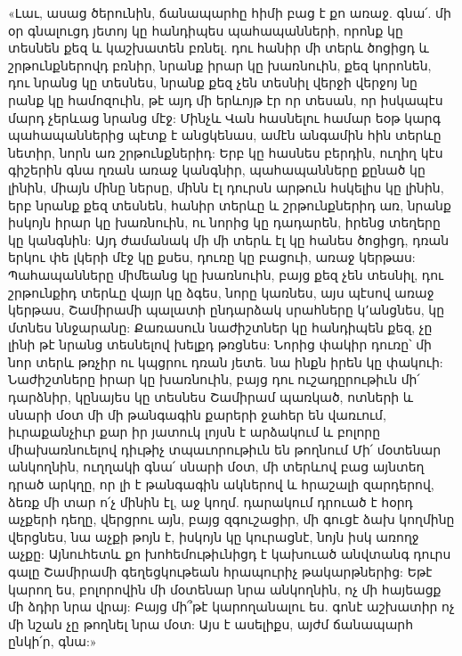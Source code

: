 \documentclass{article}
\begin{document}
{«Լաւ, ասաց ծերունին, ճանապարհը հիմի բաց է քո առաջ. գնա՛. մի օր գնալուցդ յետոյ կը հանդիպես պահապանների, որոնք կը տեսնեն քեզ և կաշխատեն բռնել. դու հանիր մի տերև ծոցիցդ և շրթունքներովդ բռնիր, նրանք իրար կը խառնուին, քեզ կորոնեն, դու նրանց կը տեսնես, նրանք քեզ չեն տեսնիլ վերջի վերջոյ նը րանք կը համոզուին, թէ այդ մի երևոյթ էր որ տեսան, որ իսկապէս մարդ չերևաց նրանց մէջ: Մինչև Վան հասնելու համար եօթ կարգ պահապաններից պէտք է անցկենաս, ամէն անգամին հին տերևը նետիր, նորն առ շրթունքներիդ: Երբ կը հասնես բերդին, ուղիղ կէս գիշերին գնա ղռան առաջ կանգնիր, պահապանները քընած կը լինին, միայն մինը ներսը, մինն էլ դուրսն արթուն հսկելիս կը լինին, երբ նրանք քեզ տեսնեն, հանիր տերևը և շրթունքներիդ առ, նրանք իսկոյն իրար կը խառնուին, ու նորից կը դադարեն, իրենց տեղերը կը կանգնին: Այդ ժամանակ մի մի տերև էլ կը հանես ծոցիցդ, դռան երկու փե լկերի մէջ կը քսես, դուռը կը բացուի, առաջ կերթաս: Պահապանները միմեանց կը խառնուին, բայց քեզ չեն տեսնիլ, դու շրթունքիդ տերևը վայր կը ձգես, նորը կառնես, այս պէսով առաջ կերթաս, Շամիրամի պալատի ընդարձակ սրահները կ՚անցնես, կը մտնես ննջարանը: Քառասուն նաժիշտներ կը հանդիպեն քեզ, չը լինի թէ նրանց տեսնելով խելքդ թռցնես: Նորից փակիր դուռը՝ մի նոր տերև թռչիր ու կպցրու դռան յետե. նա ինքն իրեն կը փակուի: Նաժիշտները իրար կը խառնուին, բայց դու ուշադըրութիւն մի՛ դարձնիր, կընայես կը տեսնես Շամիրամ պառկած, ոտների և սնարի մօտ մի մի թանգագին քարերի ջահեր են վառւում, իւրաքանչիւր քար իր յատուկ լոյսն է արձակում և բոլորը միախառնուելով դիւթիչ տպաւորութիւն են թողնում Մի՛ մօտենար անկողնին, ուղղակի գնա՛ սնարի մօտ, մի տերևով բաց այնտեղ դրած արկղը, որ լի է թանգագին ակներով և հրաշալի զարդերով, ձեռք մի տար ո՛չ մինին էլ, աջ կողմ. դարակում դրուած է հօրդ աչքերի դեղը, վերցրու այն, բայց զգուշացիր, մի գուցէ ձախ կողմինը վերցնես, նա աչքի թոյն է, իսկոյն կը կուրացնէ, նոյն իսկ առողջ աչքը: Այնուհետև քո խոհեմութիւնիցդ է կախուած անվտանգ դուրս գալը Շամիրամի գեղեցկութեան հրապուրիչ թակարթներից: Եթէ կարող ես, բոլորովին մի մօտենար նրա անկողնին, ոչ մի հայեացք մի ձդիր նրա վրայ: Բայց մի՞թէ կարողանալու ես. գոնէ աշխատիր ոչ մի նշան չը թողնել նրա մօտ: Այս է ասելիքս, այժմ ճանապարհ ընկի՛ր, գնա:»}
\clearpage
\section{}
\end{document}
